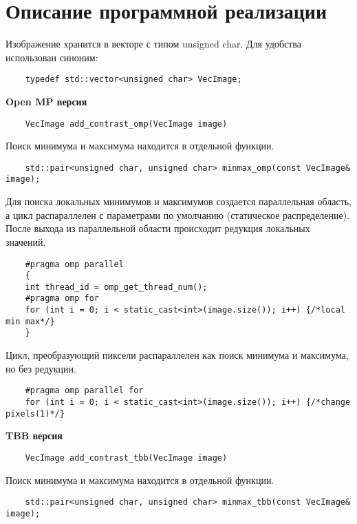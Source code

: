 \documentclass{report}
\begin{document}
    \newpage
    \section*{Описание программной реализации}
    \par Изображение хранится в векторе с типом unsigned char. Для удобства использован синоним:
    \begin{lstlisting}
    typedef std::vector<unsigned char> VecImage;
    \end{lstlisting}
    \textbf{Open MP версия}
    \begin{lstlisting}
    VecImage add_contrast_omp(VecImage image)
    \end{lstlisting}
    \par Поиск минимума и максимума находится в отдельной функции.
    \begin{lstlisting}
    std::pair<unsigned char, unsigned char> minmax_omp(const VecImage& image);
    \end{lstlisting}
    \par Для поиска локальных минимумов и максимумов создается параллельная область, а цикл распараллелен с параметрами по умолчанию (статическое распределение). После выхода из параллельной области происходит редукция локальных значений.
    \begin{lstlisting}
    #pragma omp parallel
    {
    int thread_id = omp_get_thread_num();
    #pragma omp for
    for (int i = 0; i < static_cast<int>(image.size()); i++) {/*local min max*/}
    }
    \end{lstlisting}
    \par Цикл, преобразующий пиксели распараллелен как поиск минимума и максимума, но без редукции.
    \begin{lstlisting}
    #pragma omp parallel for
    for (int i = 0; i < static_cast<int>(image.size()); i++) {/*change pixels(1)*/}
    \end{lstlisting}
    \newpage
    \textbf{TBB версия}
    \begin{lstlisting}
    VecImage add_contrast_tbb(VecImage image)
    \end{lstlisting}
    \par Поиск минимума и максимума находится в отдельной функции.
    \begin{lstlisting}
    std::pair<unsigned char, unsigned char> minmax_tbb(const VecImage& image);
    \end{lstlisting}
\end{document}
